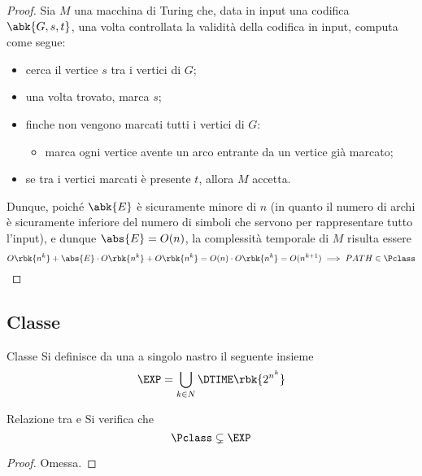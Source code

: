 \documentclass[a4paper, 12pt]{report}
\begin{document}
    \begin{proof}
        Sia $M$ una macchina di Turing che, data in input una codifica $\abk{G, s, t}$, una volta controllata la validità della codifica in input, computa come segue:

        \begin{itemize}
            \item cerca il vertice $s$ tra i vertici di $G$;
            \item una volta trovato, marca $s$;
            \item finche non vengono marcati tutti i vertici di $G$:

                \begin{itemize}
                    \item marca ogni vertice avente un arco entrante da un vertice già marcato;
                \end{itemize}
            \item se tra i vertici marcati è presente $t$, allora $M$ accetta.
        \end{itemize}

        Dunque, poiché $\abk{E}$ è sicuramente minore di $n$ (in quanto il numero di archi è sicuramente inferiore del numero di simboli che servono per rappresentare tutto l'input), e dunque $\abs{E} = O(n)$, la complessità temporale di $M$ risulta essere $$O\rbk{n^k} + \abs{E} \cdot O\rbk{n^k} + O\rbk{n^k} = O(n) \cdot O\rbk{n^k} = O(n^{k + 1}) \implies PATH \in \Pclass$$
    \end{proof}

    \subsection{Classe \EXP}

    \begin{frameddefn}{Classe \EXP}
        Si definisce  da una \TM a singolo nastro il seguente insieme $$\EXP = \bigcup_{k \in N}{\DTIME \rbk{2^{n^k}}}$$
    \end{frameddefn}

    \begin{framedprop}{Relazione tra \Pclass e \EXP}
        Si verifica che $$\Pclass \subsetneq \EXP$$
    \end{framedprop}

    \begin{proof}
        Omessa.
    \end{proof}
\end{document}
